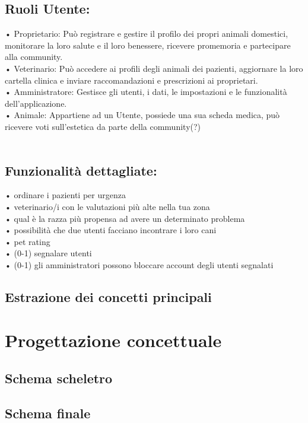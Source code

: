 \documentclass[a4paper,12pt]{report}
\begin{document}
\section{Ruoli Utente:\\}
•	Proprietario: Può registrare e gestire il profilo dei propri animali domestici, monitorare la loro salute e il loro benessere, ricevere promemoria e partecipare alla community.\\
•	Veterinario: Può accedere ai profili degli animali dei pazienti, aggiornare la loro cartella clinica e inviare raccomandazioni e prescrizioni ai proprietari.\\
•	Amministratore: Gestisce gli utenti, i dati, le impostazioni e le funzionalità dell'applicazione.\\
•	Animale: Appartiene ad un Utente, possiede una sua scheda medica, può ricevere voti sull’estetica da parte della community(?)\\\\

\section{Funzionalità dettagliate: \\}
•	ordinare i pazienti per urgenza\\
•	veterinario/i con le valutazioni più alte nella tua zona\\
•	qual è la razza più propensa ad avere un determinato problema\\
•	possibilità che due utenti facciano incontrare i loro cani\\
•	pet rating\\
•	(0-1) segnalare utenti\\
•	(0-1) gli amministratori possono bloccare account degli utenti segnalati \\

\section{Estrazione dei concetti principali}
\newpage
\chapter{Progettazione concettuale}
\section{Schema scheletro}
\section{Schema finale}
\newpage
\end{document}
